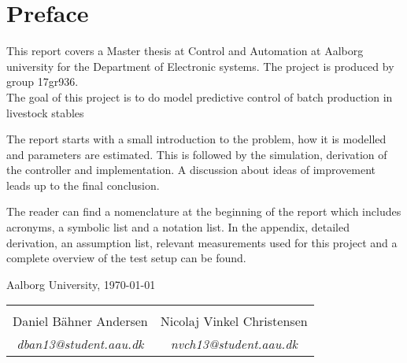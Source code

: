 \chapter*{Preface}

This report covers a Master thesis at Control and Automation at Aalborg university for the Department of Electronic systems. The project is produced by group 17gr936.\\
The goal of this project is to do model predictive control of batch production in livestock stables

The report starts with a small introduction to the problem, how it is modelled and parameters are estimated. This is followed by the simulation, derivation of the controller and implementation. A discussion about ideas of improvement leads up to the final conclusion. 

The reader can find a nomenclature at the beginning of the report which includes acronyms, a symbolic list and a notation list. In the appendix, detailed derivation, an assumption list, relevant measurements used for this project and a complete overview of the test setup can be found.


\hfill Aalborg University, \today


\vfill

\begin{table}[H]
	\centering
		\begin{tabular}{c c }
			\underline{\phantom{mmmmmmmmmmmmmmmmmmm}}       & \underline{\phantom{mmmmmmmmmmmmmmmmmmm}} \\
			Daniel Bähner Andersen			 & Nicolaj Vinkel Christensen  \\
			\textit{dban13@student.aau.dk} & \textit{nvch13@student.aau.dk}\\
		\end{tabular}
\end{table}